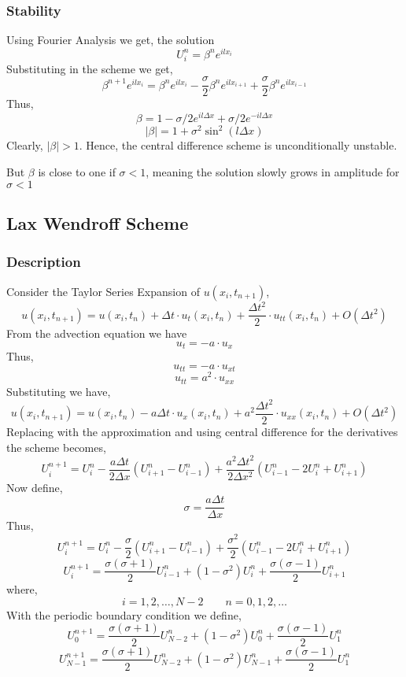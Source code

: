 \documentclass[11pt]{article}
\begin{document}
\subsubsection{Stability}
\label{sec:org2e012ef}

Using Fourier Analysis we get, the solution
$$U_i^n = \beta^n e^{i l x_i}$$
Substituting in the scheme we get,
$$\beta^{n+1} e^{i l x_i} = \beta^n e^{i l x_i} - \frac{\sigma}{2} \beta^n e^{i l x_{i+1}} + \frac{\sigma}{2} \beta^{n} e^{i l x_{i-1}}$$
Thus,
$$\beta = 1 - \sigma/2 e^{i l \Delta x} + \sigma/2 e^{- i l \Delta x}$$
$$\lvert \beta \rvert = 1 + \sigma^{2} \sin^{2} (l \Delta x)$$
Clearly, \(\lvert \beta \rvert > 1\). Hence, the central difference scheme is unconditionally unstable.

But \(\beta\) is close to one if \(\sigma < 1\), meaning the solution slowly grows in amplitude for \(\sigma < 1\)
\subsection{Lax Wendroff Scheme}
\label{sec:org6e74374}
\subsubsection{Description}
\label{sec:orgd063338}
Consider the Taylor Series Expansion of \(u(x_i,t_{n+1})\),
$$u(x_i,t_{n+1}) = u(x_i,t_n) + \Delta t \cdot u_t (x_i,t_n) + \frac{\Delta t^2}{2} \cdot u_{tt} (x_i,t_n) + O(\Delta t^2)$$
From the advection equation we have
$$u_t = -a \cdot u_x$$
Thus,
$$u_{tt} = -a \cdot u_{xt}$$
$$u_{tt} = a^2 \cdot u_{xx}$$
Substituting we have,
$$u(x_i,t_{n+1}) = u(x_i,t_n) - a \Delta t \cdot u_x (x_i,t_n) + a^2 \frac{\Delta t^2}{2} \cdot u_{xx} (x_i, t_n) + O(\Delta t^2)$$
Replacing with the approximation and using central difference for the derivatives the scheme becomes,
$$U_i^{n+1} = U_i^n - \frac{a \Delta t}{2 \Delta x} (U_{i+1}^n - U_{i-1}^n) + \frac{a^2 \Delta t^2}{2 \Delta x^2} (U_{i-1}^n - 2 U_i^n + U_{i+1}^n)$$
Now define,
$$\sigma = \frac{a \Delta t}{\Delta x}$$
Thus,
$$U_i^{n+1} = U_i^n - \frac{\sigma}{2} (U_{i+1}^n - U_{i-1}^n) + \frac{\sigma^2}{2} (U_{i-1}^n - 2 U_i^n + U_{i+1}^n)$$
$$U_i^{n+1} = \frac{\sigma \left( \sigma + 1 \right)}{2} U_{i-1}^n + \left( 1 - \sigma^2 \right) U_i^n + \frac{\sigma \left( \sigma - 1 \right)}{2} U_{i+1}^n$$
where,
$$i=1,2,\ldots,N-2 \qquad n = 0,1,2,\ldots$$
With the periodic boundary condition we define,
$$U_0^{n+1} = \frac{\sigma \left( \sigma + 1 \right)}{2} U_{N-2}^n + \left( 1 - \sigma^2 \right) U_0^n + \frac{\sigma \left( \sigma - 1 \right)}{2} U_{1}^n$$
$$U_{N-1}^{n+1} = \frac{\sigma \left( \sigma + 1 \right)}{2} U_{N-2}^n + \left( 1 - \sigma^2 \right) U_{N-1}^n + \frac{\sigma \left( \sigma - 1 \right)}{2} U_{1}^n$$
\end{document}
